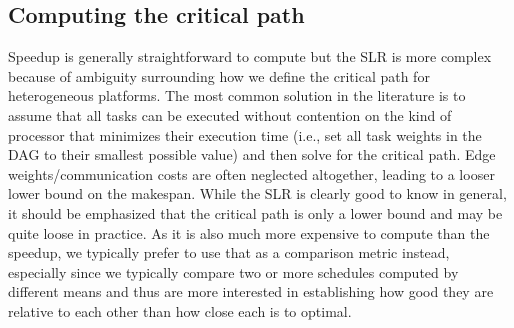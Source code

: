 \documentclass[runningheads]{llncs}
\begin{document}
\subsection{Computing the critical path}
\label{subsect.metrics}

Speedup is generally straightforward to compute but the SLR is more complex because of ambiguity surrounding how we define the critical path for heterogeneous platforms. The most common solution in the literature is to assume that all tasks can be executed without contention on the kind of processor that minimizes their execution time (i.e., set all task weights in the DAG to their smallest possible value) and then solve for the critical path. Edge weights/communication costs are often neglected altogether, leading to a looser lower bound on the makespan. While the SLR is clearly good to know in general, it should be emphasized that the critical path is only a lower bound and may be quite loose in practice. As it is also much more expensive to compute than the speedup, we typically prefer to use that as a comparison metric instead, especially since we typically compare two or more schedules computed by different means and thus are more interested in establishing how good they are relative to each other than how close each is to optimal. 






%
%
%
 
 
\end{document}

